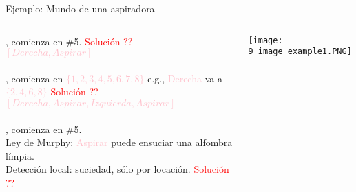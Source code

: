 \begin{frame}{Ejemplo: Mundo de una aspiradora}
    \begin{columns}
      \begin{column}{0.6\textwidth}
        , comienza en \#5.
        \textcolor{red}{Solución ??}\\
        \textcolor{Pink}{$[Derecha, Aspirar]$}\\~\\
       
        , comienza en
        \textcolor{Pink}{$\{1,2,3,4,5,6,7,8\}$} e.g., \textcolor{Pink}{Derecha} va a \textcolor{Pink}{$\{2,4,6,8\}$}
        \textcolor{red}{Solución ??}\\
        \textcolor{Pink}{$[Derecha, Aspirar, Izquierda, Aspirar]$}\\~\\
        
        , comienza en \#5.\\
        Ley de Murphy: \textcolor{Pink}{Aspirar} puede ensuciar una alfombra l\'impia.\\
        Detecci\'on local: suciedad, s\'olo por locaci\'on.
        \textcolor{red}{Soluci\'on ??}\\
        
        \end{column}
      \begin{column}{0.4\textwidth}
      \texttt{[image: 9\_image\_example1.PNG]}
      \end{column}
    \end{columns}

    
\end{frame}
